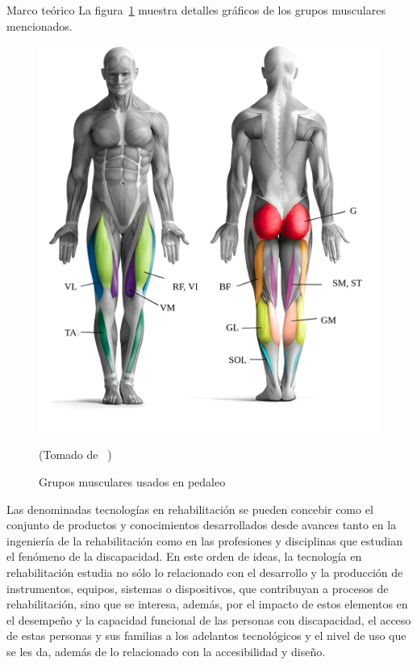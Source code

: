 \begin{thesischapter}{1} {Marco teórico}
    \vspace{10pt}
    La figura~\ref{fig: musculegroups} muestra detalles gráficos de los grupos musculares mencionados.
    \begin{figure}[ht]
        \centering
        \includegraphics[scale=0.2]{images/musculegroups.png}
        \caption{Grupos musculares usados en pedaleo}
        (Tomado de ~\cite{Quémúsc72})
        \label{fig: musculegroups}
    \end{figure}

    \vspace{10pt}
    Las denominadas tecnologías en rehabilitación se pueden concebir como el conjunto de productos y conocimientos desarrollados desde avances tanto en la ingeniería de la rehabilitación como en las profesiones y disciplinas  que estudian el fenómeno de la discapacidad. En este orden de ideas, la tecnología en rehabilitación estudia no sólo lo relacionado con el desarrollo y la producción de instrumentos, equipos, sistemas o dispositivos, 
    que contribuyan a procesos de rehabilitación, sino que se interesa, además, por el impacto de estos elementos en el desempeño y la capacidad funcional de las personas con discapacidad, el acceso
    de estas personas y sus familias a los adelantos tecnológicos y  el nivel de uso que se les da, además de lo relacionado con la accesibilidad y diseño.\cite{matheus1990tecnologia}


\end{thesischapter}

